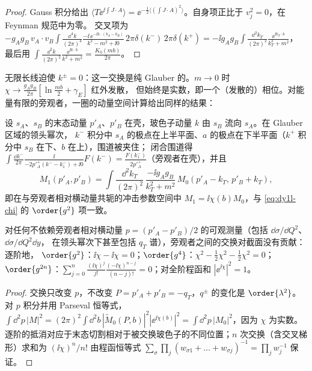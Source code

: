 \begin{proof}
Gauss 积分给出 $\langle T\ee^{\ii\int J\cdot A}\rangle=\ee^{-\frac12\langle(\int J\cdot A)^2\rangle}$。自身项正比于 $v_j^2=0$，在 Feynman 规范中为零。
交叉项为
$-g_Ag_B\,v_A\!\cdot\!v_B\int\frac{\dd^4k}{(2\pi)^4}\frac{-\ii\,\ee^{-\ii k\cdot(b_A-b_B)}}{k^2-m^2+\ii0}\,2\pi\delta(k^-)\,2\pi\delta(k^+)
=-\ii g_Ag_B\int\frac{\dd^2k_T}{(2\pi)^2}\frac{\ee^{\ii k_T\cdot b}}{k_T^2+m^2}$，
最后用 $\int\frac{\dd^2k}{(2\pi)^2}\frac{\ee^{\ii k\cdot b}}{k^2+m^2}=\frac{K_0(mb)}{2\pi}$。
\end{proof}

无限长线迫使 $k^\pm=0$：这一交换是纯 Glauber 的。$m\to0$ 时 $\chi\to\frac{g_Ag_B}{2\pi}[\ln\frac{mb}{2}+\gamma_E]$ 红外发散，
但始终是实数，即一个（发散的）相位。对能量有限的旁观者，一圈的动量空间计算给出同样的结果：

\begin{proposition}\label{prop:dy1l-res}
设 $s_A$、$s_B$ 的末态动量 $p'_A$、$p'_B$ 在壳，玻色子动量 $k$ 由 $s_B$ 流向 $s_A$。在 Glauber 区域的领头幂次，
$k^-$ 积分中 $s_A$ 的极点在上半平面、$a$ 的极点在下半平面（$k^+$ 积分中 $s_B$ 在下、$b$ 在上），围道被夹住；
闭合围道得
$\int\frac{\dd k^-}{2\pi}\frac{\ii}{-2p'^+_A(k^--k_1^-)+\ii0}F(k^-)=\frac{F(k_1^-)}{2p'^+_A}$（旁观者在壳），并且
\begin{equation}\label{eq:dy1l-M1}
M_1(p'_A,p'_B)=\int\frac{\dd^2k_T}{(2\pi)^2}\,\frac{-\ii g_Ag_B}{k_T^2+m^2}\,M_0(p'_A-k_T,\,p'_B+k_T),
\end{equation}
即在与旁观者相对横动量共轭的冲击参数空间中 $M_1=\ii\chi(b)M_0$，与 \cref{eq:dy1l-chi} 的 $\order{g^2}$ 项一致。
\end{proposition}

\begin{proposition}\label{prop:dy1l-unit}
对任何不依赖旁观者相对横动量 $p=(p'_A-p'_B)/2$ 的可观测量（包括 $\dd\sigma/\dd Q^2$、$\dd\sigma/\dd Q^2\dd y$，
在领头幂次下甚至包括 $q_T$ 谱），旁观者之间的交换对截面没有贡献：逐阶地，
$\order{g^2}$：$\ii\chi-\ii\chi=0$；$\order{g^4}$：$\chi^2-\frac12\chi^2-\frac12\chi^2=0$；
$\order{g^{2n}}$：$\sum_{j=0}^n\frac{(\ii\chi)^j}{j!}\frac{(-\ii\chi)^{n-j}}{(n-j)!}=0$；对全阶程函和 $|\ee^{\ii\chi}|^2=1$。
\end{proposition}

\begin{proof}
交换只改变 $p$，不改变 $P=p'_A+p'_B=-q_T$，$q^\pm$ 的变化是 $\order{\lambda^2}$。对 $p$ 积分并用 Parseval 恒等式，
$\int\dd^2p\,|M|^2=(2\pi)^2\int\dd^2b\,|\tilde M_0(P,b)|^2|\ee^{\ii\chi(b)}|^2=\int\dd^2p\,|M_0|^2$，因为 $\chi$ 为实数。
逐阶的抵消对应于末态切割相对于被交换玻色子的不同位置；$n$ 次交换（含交叉梯形）求和为 $(\ii\chi)^n/n!$ 由程函恒等式
$\sum_{\sigma}\prod_{j}(w_{\sigma1}+\dots+w_{\sigma j})^{-1}=\prod_jw_j^{-1}$ 保证。
\end{proof}


